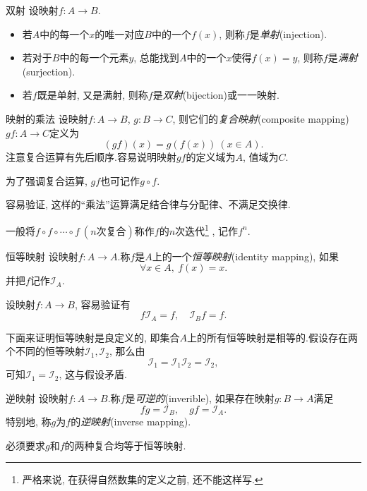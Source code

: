 \begin{definition}{双射}
	设映射$f: A \to B$.
	\begin{itemize}
		\item 若$A$中的每一个$x$的唯一对应$B$中的一个$f(x)$, 则称$f$是\textit{单射}(injection).
		\item 若对于$B$中的每一个元素$y$, 总能找到$A$中的一个$x$使得$f(x)=y$, 则称$f$是\textit{满射}(surjection).
		\item 若$f$既是单射, 又是满射, 则称$f$是\textit{双射}(bijection)或一一映射.
	\end{itemize}
\end{definition}

\begin{definition}{映射的乘法}
    设映射$f: A \to B$, $g: B \to C$, 则它们的\textit{复合映射}(composite mapping)~$gf: A \to C$定义为$$(gf)(x)=g(f(x)) \ (x \in A).$$
    注意复合运算有先后顺序.容易说明映射$gf$的定义域为$A$, 值域为$C$.
\end{definition}
\begin{remark}
	为了强调复合运算, $gf$也可记作$g \circ f$.
\end{remark}

容易验证, 这样的“乘法”运算满足结合律与分配律、不满足交换律.

一般将$f \circ f \circ \cdots \circ f~(n\textit{次复合})$称作$f$的$n$次迭代\footnote{严格来说, 在获得自然数集的定义之前, 还不能这样写.} , 记作$f^n$.

\begin{definition}{恒等映射}
	设映射$f: A \to A$.称$f$是$A$上的一个\textit{恒等映射}(identity mapping), 如果$$\forall x\in A, ~f(x)=x.$$
	并把$f$记作$\mathcal{I}_A$.
\end{definition}
\begin{remark}
	设映射$f :  A \to B$, 容易验证有$$f\mathcal{I}_A=f, \quad \mathcal{I}_Bf=f.$$
\end{remark}

下面来证明恒等映射是良定义的, 即集合$A$上的所有恒等映射是相等的.假设存在两个不同的恒等映射$\mathcal{I}_1, \mathcal{I}_2$, 那么由$$\mathcal{I}_1 = \mathcal{I}_1 \mathcal{I}_2 = \mathcal{I}_2, $$
可知$\mathcal{I}_1 = \mathcal{I}_2$, 这与假设矛盾.

\begin{definition}{逆映射}
	设映射$f: A \to B$.称$f$是\textit{可逆的}(inverible), 如果存在映射$g: B \to A$满足$$fg=\mathcal{I}_B, \quad gf=\mathcal{I}_A.$$
	特别地, 称$g$为$f$的\textit{逆映射}(inverse mapping).
\end{definition}
\begin{remark}
	必须要求$g$和$f$的两种复合均等于恒等映射. 
\end{remark}

